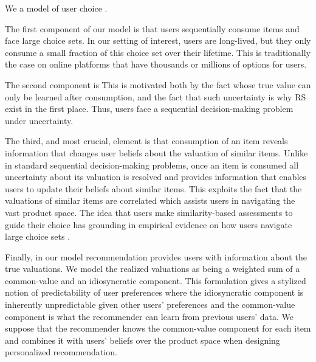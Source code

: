 \documentclass{article}
\newcommand{\xhdr}[1]{\vspace{1mm} \noindent{\bf #1}}
\begin{document}
\xhdr{Our Model\dgedit{.}} We  a model of user choice .
\par
The first component of our model is that users sequentially consume items and face large choice sets. In our setting of interest, users are long-lived, but they only consume a small fraction of this choice set over their lifetime. This is traditionally the case on online platforms that have thousands or millions of options for users.
\par
The second component is
This is motivated both by the fact  whose true value can only be learned after consumption, and the fact that such uncertainty is why RS exist in the first place. Thus, users face a sequential decision-making problem under uncertainty.
\par 
The third, and most crucial, element is that consumption of an item reveals information that changes user beliefs about the valuation of similar items. Unlike in standard sequential decision-making problems, once an item is consumed all uncertainty about its valuation is resolved and provides information that enables users to update their beliefs about similar items. This exploits the fact that the valuations of similar items are correlated which assists users in navigating the vast product space. The idea that users make similarity-based assessments to guide their choice has grounding in  empirical evidence on how users navigate large choice sets \cite{schulz2019structured}.
\par 
Finally, in our model recommendation provides users with information about the true valuations. We model the realized valuations as being a weighted sum of a common-value and an idiosyncratic component. This formulation gives a stylized notion of predictability of user preferences where the idiosyncratic component is inherently unpredictable given other users' preferences and the common-value component is what the recommender can learn from previous users' data. We suppose that the recommender knows the common-value component for each item and combines it with users' beliefs over the product space when designing personalized recommendation.
\end{document}
